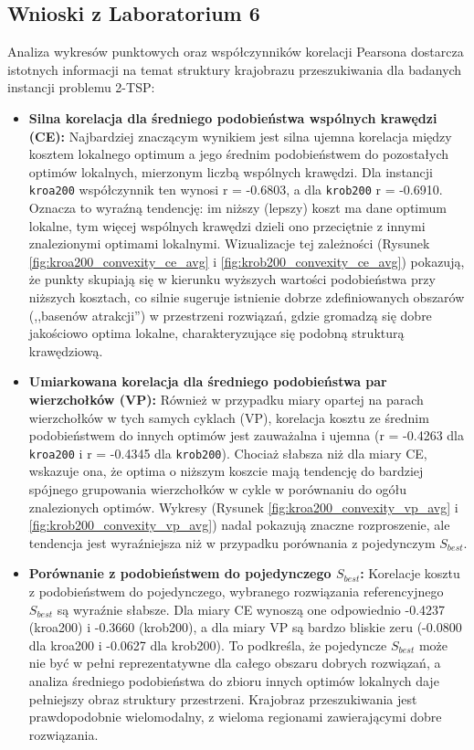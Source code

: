 \documentclass[12pt,a4paper]{article}
\begin{document}
\subsection{Wnioski z Laboratorium 6}
Analiza wykresów punktowych oraz współczynników korelacji Pearsona dostarcza istotnych informacji na temat struktury krajobrazu przeszukiwania dla badanych instancji problemu 2-TSP:
\begin{itemize}
    \item \textbf{Silna korelacja dla średniego podobieństwa wspólnych krawędzi (CE):} Najbardziej znaczącym wynikiem jest silna ujemna korelacja między kosztem lokalnego optimum a jego średnim podobieństwem do pozostałych optimów lokalnych, mierzonym liczbą wspólnych krawędzi. Dla instancji \texttt{kroa200} współczynnik ten wynosi r = -0.6803, a dla \texttt{krob200} r = -0.6910. Oznacza to wyraźną tendencję: im niższy (lepszy) koszt ma dane optimum lokalne, tym więcej wspólnych krawędzi dzieli ono przeciętnie z innymi znalezionymi optimami lokalnymi. Wizualizacje tej zależności (Rysunek \ref{fig:kroa200_convexity_ce_avg} i \ref{fig:krob200_convexity_ce_avg}) pokazują, że punkty skupiają się w kierunku wyższych wartości podobieństwa przy niższych kosztach, co silnie sugeruje istnienie dobrze zdefiniowanych obszarów (,,basenów atrakcji'') w przestrzeni rozwiązań, gdzie gromadzą się dobre jakościowo optima lokalne, charakteryzujące się podobną strukturą krawędziową.

    \item \textbf{Umiarkowana korelacja dla średniego podobieństwa par wierzchołków (VP):} Również w przypadku miary opartej na parach wierzchołków w tych samych cyklach (VP), korelacja kosztu ze średnim podobieństwem do innych optimów jest zauważalna i ujemna (r = -0.4263 dla \texttt{kroa200} i r = -0.4345 dla \texttt{krob200}). Chociaż słabsza niż dla miary CE, wskazuje ona, że optima o niższym koszcie mają tendencję do bardziej spójnego grupowania wierzchołków w cykle w porównaniu do ogółu znalezionych optimów. Wykresy (Rysunek \ref{fig:kroa200_convexity_vp_avg} i \ref{fig:krob200_convexity_vp_avg}) nadal pokazują znaczne rozproszenie, ale tendencja jest wyraźniejsza niż w przypadku porównania z pojedynczym $S_{best}$.

    \item \textbf{Porównanie z podobieństwem do pojedynczego $S_{best}$:} Korelacje kosztu z podobieństwem do pojedynczego, wybranego rozwiązania referencyjnego $S_{best}$ są wyraźnie słabsze. Dla miary CE wynoszą one odpowiednio -0.4237 (kroa200) i -0.3660 (krob200), a dla miary VP są bardzo bliskie zeru (-0.0800 dla kroa200 i -0.0627 dla krob200). To podkreśla, że pojedyncze $S_{best}$ może nie być w pełni reprezentatywne dla całego obszaru dobrych rozwiązań, a analiza średniego podobieństwa do zbioru innych optimów lokalnych daje pełniejszy obraz struktury przestrzeni. Krajobraz przeszukiwania jest prawdopodobnie wielomodalny, z wieloma regionami zawierającymi dobre rozwiązania.


\end{itemize}
\end{document}
